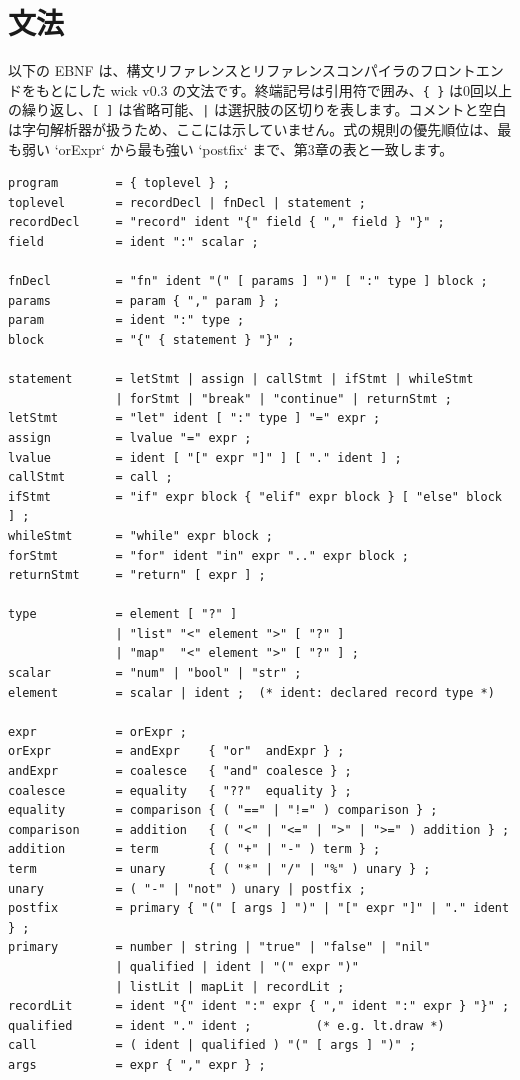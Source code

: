 \chapter{文法}

以下の EBNF は、構文リファレンスとリファレンスコンパイラのフロントエンドをもとにした wick v0.3 の文法です。終端記号は引用符で囲み、\texttt{\{\ \}} は0回以上の繰り返し、\texttt{[\ ]} は省略可能、\texttt{|} は選択肢の区切りを表します。コメントと空白は字句解析器が扱うため、ここには示していません。式の規則の優先順位は、最も弱い `orExpr` から最も強い `postfix` まで、第3章の表と一致します。

\begin{lstlisting}[basicstyle=\ttfamily\small,keywordstyle={}]
program        = { toplevel } ;
toplevel       = recordDecl | fnDecl | statement ;
recordDecl     = "record" ident "{" field { "," field } "}" ;
field          = ident ":" scalar ;

fnDecl         = "fn" ident "(" [ params ] ")" [ ":" type ] block ;
params         = param { "," param } ;
param          = ident ":" type ;
block          = "{" { statement } "}" ;

statement      = letStmt | assign | callStmt | ifStmt | whileStmt
               | forStmt | "break" | "continue" | returnStmt ;
letStmt        = "let" ident [ ":" type ] "=" expr ;
assign         = lvalue "=" expr ;
lvalue         = ident [ "[" expr "]" ] [ "." ident ] ;
callStmt       = call ;
ifStmt         = "if" expr block { "elif" expr block } [ "else" block ] ;
whileStmt      = "while" expr block ;
forStmt        = "for" ident "in" expr ".." expr block ;
returnStmt     = "return" [ expr ] ;

type           = element [ "?" ]
               | "list" "<" element ">" [ "?" ]
               | "map"  "<" element ">" [ "?" ] ;
scalar         = "num" | "bool" | "str" ;
element        = scalar | ident ;  (* ident: declared record type *)

expr           = orExpr ;
orExpr         = andExpr    { "or"  andExpr } ;
andExpr        = coalesce   { "and" coalesce } ;
coalesce       = equality   { "??"  equality } ;
equality       = comparison { ( "==" | "!=" ) comparison } ;
comparison     = addition   { ( "<" | "<=" | ">" | ">=" ) addition } ;
addition       = term       { ( "+" | "-" ) term } ;
term           = unary      { ( "*" | "/" | "%" ) unary } ;
unary          = ( "-" | "not" ) unary | postfix ;
postfix        = primary { "(" [ args ] ")" | "[" expr "]" | "." ident } ;
primary        = number | string | "true" | "false" | "nil"
               | qualified | ident | "(" expr ")"
               | listLit | mapLit | recordLit ;
recordLit      = ident "{" ident ":" expr { "," ident ":" expr } "}" ;
qualified      = ident "." ident ;         (* e.g. lt.draw *)
call           = ( ident | qualified ) "(" [ args ] ")" ;
args           = expr { "," expr } ;


\end{lstlisting}
